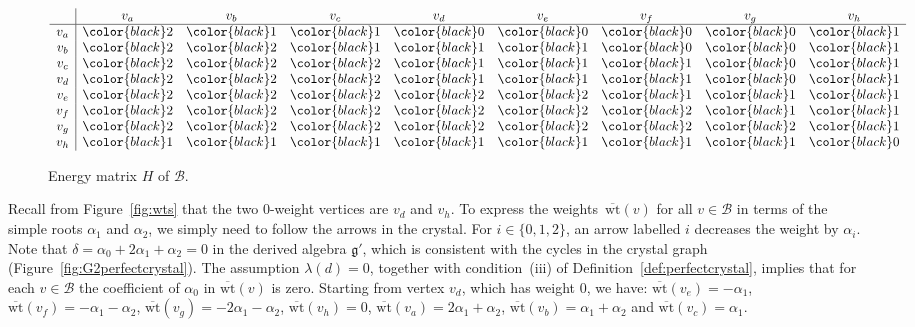 \documentclass[10pt,a4paper]{amsart}
\numberwithin{equation}{section}
\theoremstyle{definition}
\begin{document}
\begin{figure}[t]
\centering
$
\begin{array}{c|cccccccc}
& v_a & v_b & v_c & v_d & v_e & v_f & v_g & v_h \\
\hline
v_a & {\color{black}2} & {\color{black}1} & {\color{black}1} & {\color{black}0} & {\color{black}0} & {\color{black}0} & {\color{black}0} & {\color{black}1} \\
v_b & {\color{black}2} & {\color{black}2} & {\color{black}1} & {\color{black}1} & {\color{black}1} & {\color{black}0} & {\color{black}0} & {\color{black}1} \\
v_c & {\color{black}2} & {\color{black}2} & {\color{black}2} & {\color{black}1} & {\color{black}1} & {\color{black}1} & {\color{black}0} & {\color{black}1} \\
v_d & {\color{black}2} & {\color{black}2} & {\color{black}2} & {\color{black}1} & {\color{black}1} & {\color{black}1} & {\color{black}0} & {\color{black}1} \\
v_e & {\color{black}2} & {\color{black}2} & {\color{black}2} & {\color{black}2} & {\color{black}2} & {\color{black}1} & {\color{black}1} & {\color{black}1} \\
v_f & {\color{black}2} & {\color{black}2} & {\color{black}2} & {\color{black}2} & {\color{black}2} & {\color{black}2} & {\color{black}1} & {\color{black}1} \\
v_g & {\color{black}2} & {\color{black}2} & {\color{black}2} & {\color{black}2} & {\color{black}2} & {\color{black}2} & {\color{black}2} & {\color{black}1} \\
v_h & {\color{black}1} & {\color{black}1} & {\color{black}1} & {\color{black}1} & {\color{black}1} & {\color{black}1} & {\color{black}1} & {\color{black}0} \\
\end{array}
$
\caption{Energy matrix $H$ of $\mathcal{B}$.}
\label{fig:G2energyfn}
\end{figure}

Recall from Figure~\ref{fig:wts} that the two 0-weight vertices are $v_d$ and $v_h$. To express the weights~$\overline{\mathrm{wt}}(v)$ for all $v\in\mathcal{B}$ in terms of the simple roots $\alpha_1$ and $\alpha_2$, we simply need to follow the arrows in the crystal. For $i \in \{0,1,2\}$, an arrow labelled $i$ decreases the weight by $\alpha_i$. Note that $\delta = \alpha_0 + 2\alpha_1 + \alpha_2 = 0$ in the derived algebra $\mathfrak{g}'$, which is consistent with the cycles in the crystal graph (Figure~\ref{fig:G2perfectcrystal}). The assumption $\lambda(d)=0$, together with condition~(iii) of Definition~\ref{def:perfectcrystal}, implies that for each $v\in\mathcal{B}$ the coefficient of $\alpha_0$ in $\overline{\mathrm{wt}}(v)$ is zero. Starting from vertex $v_d$, which has weight $0$, we have: $\overline{\mathrm{wt}}(v_e)= -\alpha_1$, $\overline{\mathrm{wt}}(v_f)= -\alpha_1-\alpha_2$, $\overline{\mathrm{wt}}(v_g)= -2\alpha_1-\alpha_2$, $\overline{\mathrm{wt}}(v_h)= 0$, $\overline{\mathrm{wt}}(v_a)= 2\alpha_1+\alpha_2$, $\overline{\mathrm{wt}}(v_b)= \alpha_1+\alpha_2$ and $\overline{\mathrm{wt}}(v_c)= \alpha_1$.
\end{document}
